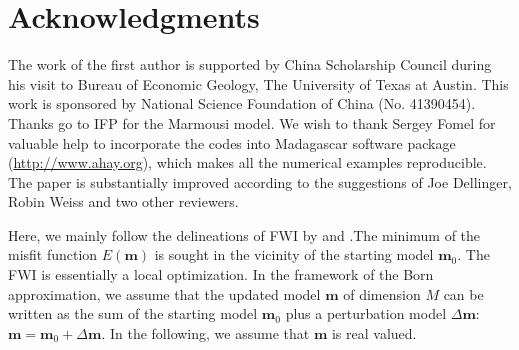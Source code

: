 \section*{Acknowledgments}

The work of the first author is supported by China Scholarship Council during his visit to Bureau of Economic Geology, The University of Texas at Austin. 
This work is sponsored by National Science Foundation of China (No. 41390454). Thanks go to IFP for the Marmousi model. We wish to thank Sergey Fomel for valuable help to incorporate the codes into Madagascar software package \citep{m8r} (\url{http://www.ahay.org}), which makes all the numerical examples reproducible. The paper is substantially improved according to the suggestions of Joe Dellinger, Robin Weiss and two other reviewers.



\label{app:misfit}

Here, we mainly follow the delineations of FWI by \cite{pratt1998gauss} and  \cite{virieux2009overview}.The minimum of the misfit function $E(\textbf{m})$ is sought in the vicinity of the starting model $\textbf{m}_0$. The FWI is essentially a local optimization.
In the framework of the Born approximation, we assume that the updated model $\textbf{m}$ of dimension $M$ can be written as the sum of the starting model $\textbf{m}_0$ plus a perturbation model $\Delta \textbf{m}$: $\textbf{m}=\textbf{m}_0+\Delta \textbf{m}$. In the following, we assume that $\textbf{m}$ is real valued.

